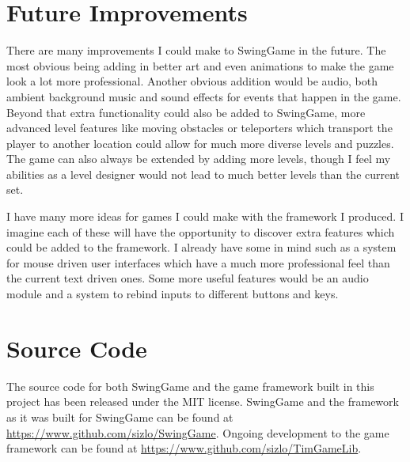 \documentclass[]{report}
\begin{document}
	\section{Future Improvements}
	There are many improvements I could make to SwingGame in the future. The most obvious being adding in better art and even animations to make the game look a lot more professional. Another obvious addition would be audio, both ambient background music and sound effects for events that happen in the game. Beyond that extra functionality could also be added to SwingGame, more advanced level features like moving obstacles or teleporters which transport the player to another location could allow for much more diverse levels and puzzles. The game can also always be extended by adding more levels, though I feel my abilities as a level designer would not lead to much better levels than the current set.
	
	I have many more ideas for games I could make with the framework I produced. I imagine each of these will have the opportunity to discover extra features which could be added to the framework. I already have some in mind such as a system for mouse driven user interfaces which have a much more professional feel than the current text driven ones. Some more useful features would be an audio module and a system to rebind inputs to different buttons and keys.
	
	\section{Source Code}
	The source code for both SwingGame and the game framework built in this project has been released under the MIT license. SwingGame and the framework as it was built for SwingGame can be found at \url{https://www.github.com/sizlo/SwingGame}. Ongoing development to the game framework can be found at \url{https://www.github.com/sizlo/TimGameLib}.
	
\end{document}
